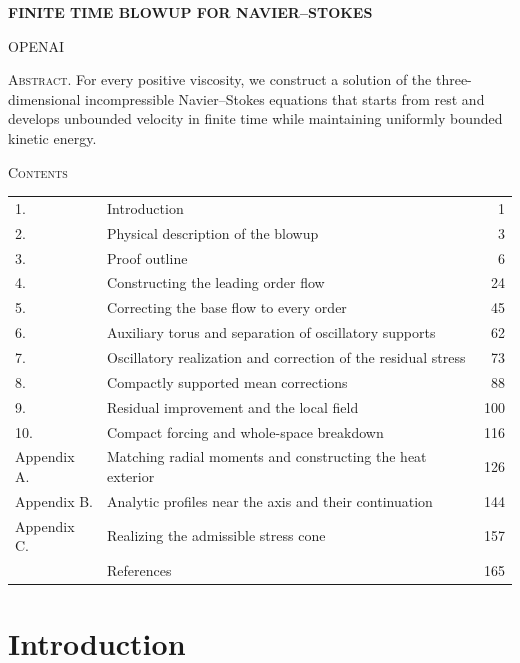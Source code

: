 %
\begin{center}
  {\Large\bfseries FINITE TIME BLOWUP FOR NAVIER--STOKES\par}
  \vspace{2.5em}
  {\large OPENAI\par}
\end{center}

\vspace{2em}
\noindent\textsc{Abstract.} For every positive viscosity, we construct a solution of the three-dimensional
incompressible Navier--Stokes equations that starts from rest and develops unbounded velocity
in finite time while maintaining uniformly bounded kinetic energy.

\vspace{3em}
\begin{center}
  {\large\textsc{Contents}}
\end{center}
\begin{tabular*}{\textwidth}{@{\extracolsep{\fill}}llr}
1. & Introduction & 1\\
2. & Physical description of the blowup & 3\\
3. & Proof outline & 6\\
4. & Constructing the leading order flow & 24\\
5. & Correcting the base flow to every order & 45\\
6. & Auxiliary torus and separation of oscillatory supports & 62\\
7. & Oscillatory realization and correction of the residual stress & 73\\
8. & Compactly supported mean corrections & 88\\
9. & Residual improvement and the local field & 100\\
10. & Compact forcing and whole-space breakdown & 116\\
Appendix A. & Matching radial moments and constructing the heat exterior & 126\\
Appendix B. & Analytic profiles near the axis and their continuation & 144\\
Appendix C. & Realizing the admissible stress cone & 157\\
& References & 165
\end{tabular*}

\section{Introduction}\label{sec:1}

